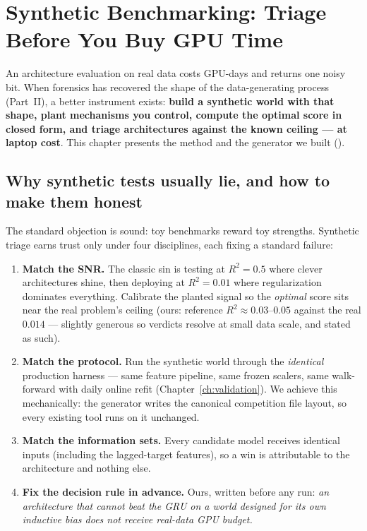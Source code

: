 \chapter[Synthetic Benchmarking]{Synthetic Benchmarking: Triage Before
You Buy GPU Time}
\label{ch:synthetic}

An architecture evaluation on real data costs GPU-days and returns one
noisy bit. When forensics has recovered the shape of the data-generating
process (Part~II), a better instrument exists: \textbf{build a synthetic
world with that shape, plant mechanisms you control, compute the optimal
score in closed form, and triage architectures against the known ceiling
--- at laptop cost}. This chapter presents the method and the generator we
built ().

\section{Why synthetic tests usually lie, and how to make them honest}

The standard objection is sound: toy benchmarks reward toy strengths.
Synthetic triage earns trust only under four disciplines, each fixing a
standard failure:

\begin{enumerate}
\item \textbf{Match the SNR.} The classic sin is testing at $R^2 = 0.5$
  where clever architectures shine, then deploying at $R^2 = 0.01$ where
  regularization dominates everything. Calibrate the planted signal so
  the \emph{optimal} score sits near the real problem's ceiling (ours:
  reference $R^2 \approx 0.03$--$0.05$ against the real $0.014$ ---
  slightly generous so verdicts resolve at small data scale, and stated
  as such).
\item \textbf{Match the protocol.} Run the synthetic world through the
  \emph{identical} production harness --- same feature pipeline, same
  frozen scalers, same walk-forward with daily online refit
  (Chapter~\ref{ch:validation}). We achieve this mechanically: the
  generator writes the canonical competition file layout, so every
  existing tool runs on it unchanged.
\item \textbf{Match the information sets.} Every candidate model receives
  identical inputs (including the lagged-target features), so a win is
  attributable to the architecture and nothing else.
\item \textbf{Fix the decision rule in advance.} Ours, written before any
  run: \emph{an architecture that cannot beat the GRU on a world designed
  for its own inductive bias does not receive real-data GPU budget.}
\end{enumerate}

